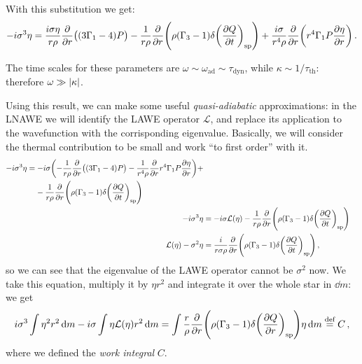 \documentclass[main.tex]{subfiles}
\begin{document}
With this substitution we get: 
%
\begin{align}
- i \sigma^3 \eta = \frac{i \sigma \eta }{r \rho }
\pdv{}{r} \qty((3 \Gamma_1 -4)P) - \frac{1}{r \rho }
\pdv{}{r} \qty(\rho (\Gamma_3 -1) \delta \qty(\pdv{Q}{t})_{\text{sp}}) 
+ \frac{i \sigma}{r^{4} \rho } \pdv{}{r} \qty(r^{4} \Gamma_1 P \pdv{\eta }{r})
\,.
\end{align}



The time scales for these parameters are \(\omega \sim \omega _{\text{ad}} \sim \tau _{\text{dyn}}\), while \(\kappa \sim 1/ \tau _{\text{th}}\): therefore \(\omega \gg \abs{\kappa } \).

Using this result, we can make some useful \emph{quasi-adiabatic} approximations: in the LNAWE we will identify the LAWE operator \(\mathcal{L}\), and replace its application to the wavefunction with the corrisponding eigenvalue. Basically, we will consider the thermal contribution to be small and work ``to first order'' with  it.
%
\begin{subequations}
\begin{align}
\begin{split}
- i \sigma^3 \eta  &= 
-i \sigma \qty(- \frac{1}{r \rho } \pdv{}{r} \qty((3\Gamma_1 -4) P) - \frac{1}{r^{4} \rho } \pdv{}{r} r^{4} \Gamma_1 P \pdv{\eta }{r}) + \\
&\phantom{=}\ 
 - \frac{1}{r \rho } \pdv{}{r} 
\qty(\rho (\Gamma_3 -1) \delta \qty(\pdv{Q}{t})_{\text{sp}})
\end{split} 
\\
- i \sigma^3 \eta &= 
- i \sigma \mathcal{L}(\eta ) 
- \frac{1}{r \rho } \pdv{}{r} 
\qty(\rho (\Gamma_3 -1) \delta \qty(\pdv{Q}{t})_{\text{sp}}) \\
\mathcal{L}(\eta ) - \sigma^2 \eta &= 
\frac{i}{r \sigma  \rho } \pdv{}{r} 
\qty(\rho (\Gamma_3 -1) \delta \qty(\pdv{Q}{t})_{\text{sp}})
\,,
\end{align}
\end{subequations}
%
so we can see that the eigenvalue of the LAWE operator cannot be \(\sigma^2\) now. We take this equation, multiply it by \(\eta r^2\) and integrate it over the whole star in \(\dd{m}\): we get 
%
\begin{align}
i \sigma^3 \int \eta^2r^2 \dd{m} 
- i \sigma \int \eta \mathcal{L}(\eta) r^2 \dd{m}
= \int \frac{r}{\rho } \pdv{}{r} \qty(\rho (\Gamma_3 -1) \delta \qty(\pdv{Q}{r}) _{\text{sp}}) \eta \dd{m}
\overset{\text{def}}{=} C
\,,
\end{align}
%
where we defined the \emph{work integral} \(C\). 
\end{document}
